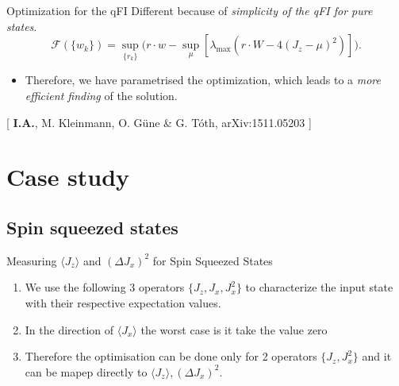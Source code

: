 \documentclass{beamer}
\newcommand{\expect}[1]{\ensuremath{\langle #1 \rangle}}
\newcommand{\varian}[1]{\ensuremath{\left(\Delta #1 \right)^2}}
\newcommand{\citate}[1]{\footnotesize{\color{gray}[ #1 ]}

	}
\begin{document}
		\begin{frame}
			\begin{block}
				{Optimization for the qFI}
				Different because of \emph{\color{blue} simplicity of the qFI for pure states}.
				{\small
				\[
				\mathcal{F}(\{w_k\}) = \sup_{\{r_k\}} \big( r\cdot w - \sup_{\mu} [ \lambda_{\max} ( r\cdot W - 4(J_z-\mu)^2 ) ] \big).
				\]}
			\end{block}
			\begin{itemize}
				\item Therefore, we have parametrised the optimization, which leads to a \emph{more efficient finding} of the solution.

			\end{itemize}

			\citate{{\bf I.A.}, M. Kleinmann, O. G\"une \& G. T\'oth, arXiv:1511.05203}

		\end{frame}

\section{Case study}

		\begin{frame}
			\tableofcontents[currentsection]

		\end{frame}

		\begin{frame}


		\end{frame}

	\subsection{Spin squeezed states}

		\begin{frame}
			{Measuring $\expect{J_z}$ and $\varian{J_x}$ for Spin Squeezed States}

			\begin{enumerate}
				\item We use the following 3 operators $\{ J_z,J_x,J_x^2 \}$ to characterize the input state with their respective expectation values.
				\item In the direction of $\expect{J_x}$ the worst case is it take the value zero
				\item Therefore the optimisation can be done only for 2 operators $\{ J_z,J_x^2 \}$ and it can be mapep directly to $\expect{J_z},\varian{J_x}$.

			\end{enumerate}

		\end{frame}
\end{document}
